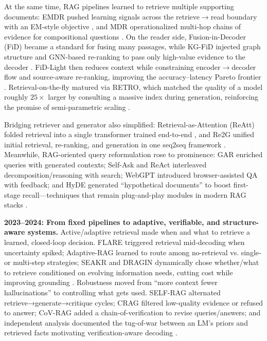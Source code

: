 At the same time, RAG pipelines learned to retrieve multiple supporting documents: EMDR pushed learning signals across the retrieve$\rightarrow$read boundary with an EM-style objective \cite{emdr2021}, and MDR operationalized multi-hop chains of evidence for compositional questions \cite{mdr2020}. On the reader side, Fusion-in-Decoder (FiD) became a standard for fusing many passages, while KG-FiD injected graph structure and GNN-based re-ranking to pass only high-value evidence to the decoder \cite{fid2020,kgfid2021}. FiD-Light then reduces context while constraining encoder$\rightarrow$decoder flow and source-aware re-ranking, improving the accuracy–latency Pareto frontier \cite{fidlight2022}. Retrieval-on-the-fly matured via RETRO, which matched the quality of a model roughly $25\times$ larger by consulting a massive index during generation, reinforcing the promise of semi-parametric scaling \cite{retro2021}.

Bridging retriever and generator also simplified: Retrieval-as-Attention (ReAtt) folded retrieval into a single transformer trained end-to-end \cite{reatt2022}, and Re2G unified initial retrieval, re-ranking, and generation in one seq2seq framework \cite{re2g2022}. Meanwhile, RAG-oriented query reformulation rose to prominence: GAR enriched queries with generated contexts; Self-Ask and ReAct interleaved decomposition/reasoning with search; WebGPT introduced browser-assisted QA with feedback; and HyDE generated ``hypothetical documents'' to boost first-stage recall---techniques that remain plug-and-play modules in modern RAG stacks \cite{gar2021, selfask2022, react2022, webgpt2021, hyde2022}.

\textbf{2023--2024: From fixed pipelines to adaptive, verifiable, and structure-aware systems.}
Active/adaptive retrieval made when and what to retrieve a learned, closed-loop decision. FLARE triggered retrieval mid-decoding when uncertainty spiked; Adaptive-RAG learned to route among no-retrieval vs. single- or multi-step strategies; SEAKR and DRAGIN dynamically chose whether/what to retrieve conditioned on evolving information needs, cutting cost while improving grounding \cite{flare2023, adaptive_rag2024, seakr2024, dragin2024}. Robustness moved from “more context fewer hallucinations” to controlling what gets used. SELF-RAG alternated retrieve→generate→critique cycles; CRAG filtered low-quality evidence or refused to answer; CoV-RAG added a chain-of-verification to revise queries/answers; and independent analysis documented the tug-of-war between an LM’s priors and retrieved facts motivating verification-aware decoding \cite{selfrag2023, crag2024, covrag2024, lmpriors2024}.

